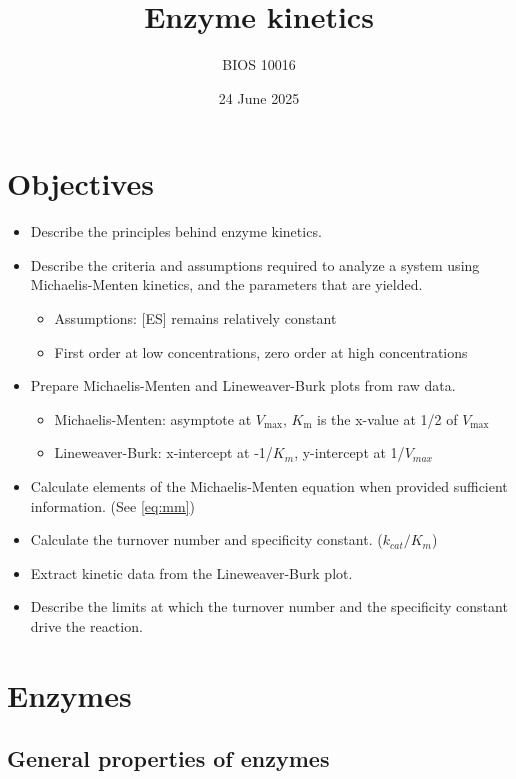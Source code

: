 \documentclass[letterpaper, 12pt]{article}
\title{Enzyme kinetics}
\author{BIOS 10016}
\date{24 June 2025}
\begin{document}
\maketitle

\section*{Objectives}

\begin{itemize}
\item Describe the principles behind enzyme kinetics.
\item Describe the criteria and assumptions required to analyze a system using Michaelis-Menten kinetics, and the parameters that are yielded.
\begin{itemize}
\item Assumptions: [ES] remains relatively constant
\item First order at low concentrations, zero order at high concentrations
\end{itemize}
\item Prepare Michaelis-Menten and Lineweaver-Burk plots from raw data.
\begin{itemize}
\item Michaelis-Menten: asymptote at $V_\text{max}$, $K_\text{m}$ is the x-value at 1/2 of $V_\text{max}$
\item Lineweaver-Burk: x-intercept at -1/$K_m$, y-intercept at 1/$V_{max}$
\end{itemize}
\item Calculate elements of the Michaelis-Menten equation when provided sufficient information. (See \ref{eq:mm})
\item Calculate the turnover number and specificity constant. ($k_{cat}/K_m$)
\item Extract kinetic data from the Lineweaver-Burk plot.
\item Describe the limits at which the turnover number and the specificity constant drive the reaction.
\end{itemize}

\newpage

\section*{Enzymes}

\subsection*{General properties of enzymes}
\end{document}
